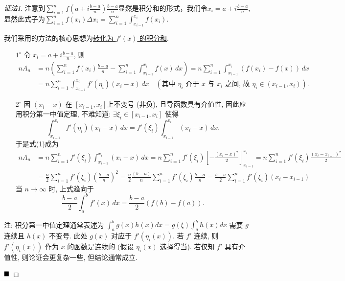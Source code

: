 \documentclass[lang=cn,newtx,10pt,scheme=chinese]{elegantbook}
\begin{document}
\begin{proof}[证法I]
    注意到$\sum_{i=1}^{n} f\left(a+i\frac{b-a}{n}\right)\frac{b-a}{n}$显然是积分和的形式，我们令$x_i=a+i\frac{b-a}{n}$,显然此式子为$\sum_{i=1}^{n} f\left(x_i\right)\Delta x_i = \sum_{i=1}^{n} \int_{x_{i-1}}^{x_i}f\left(x_i\right)$.

    我们采用的方法的核心思想为\underline{转化为 $f'(x)$ 的积分和}.
\begin{enumerate}
    \item[$1^\circ$] 令 $x_i = a + i \frac{b-a}{n}$, 则
    \begin{align*} nA_n &= n \left( \sum_{i=1}^n f(x_i) \frac{b-a}{n} - \sum_{i=1}^n \int_{x_{i-1}}^{x_i} f(x) \,dx \right) = n \sum_{i=1}^n \int_{x_{i-1}}^{x_i} (f(x_i) - f(x)) \,dx \quad  \\ &= n \sum_{i=1}^n \int_{x_{i-1}}^{x_i} f'(\eta_i)(x_i - x) \,dx \quad (\text{其中 } \eta_i \text{ 介于 } x \text{ 与 } x_i \text{ 之间, 故 } \eta_i \in (x_{i-1}, x_i)). \end{align*}
    \item[$2^\circ$] 因 $(x_i - x)$ 在 $[x_{i-1}, x_i]$上不变号 (非负), 且导函数具有介值性, 因此应用积分第一中值定理, 不难知道: $\exists \xi_i \in [x_{i-1}, x_i]$ 使得
    $$ \int_{x_{i-1}}^{x_i} f'(\eta_i)(x_i - x) \,dx = f'(\xi_i) \int_{x_{i-1}}^{x_i} (x_i - x) \,dx. $$
    于是式(1)成为
    \begin{align*} nA_n &= n \sum_{i=1}^n f'(\xi_i) \int_{x_{i-1}}^{x_i} (x_i - x) \,dx = n \sum_{i=1}^n f'(\xi_i) \left[ -\frac{(x_i-x)^2}{2} \right]_{x_{i-1}}^{x_i} = n \sum_{i=1}^n f'(\xi_i) \frac{(x_i-x_{i-1})^2}{2} \\ &= \frac{n}{2} \sum_{i=1}^n f'(\xi_i) \left(\frac{b-a}{n}\right)^2 = \frac{n}{2} \frac{(b-a)}{n} \sum_{i=1}^n f'(\xi_i) \frac{b-a}{n} = \frac{b-a}{2} \sum_{i=1}^n f'(\xi_i) (x_i-x_{i-1}) \end{align*}
    当 $n \to \infty$ 时, 上式趋向于
    $$ \frac{b-a}{2} \int_a^b f'(x) \,dx = \frac{b-a}{2} (f(b)-f(a)). $$
\end{enumerate}
\begin{remark}
    注: 积分第一中值定理通常表述为 $\int_a^b g(x)h(x)dx = g(\xi)\int_a^b h(x)dx$ 需要 $g$ 连续且 $h(x)$ 不变号. 此处 $g(x)$ 对应于 $f'(\eta_i(x))$. 若 $f'$ 连续, 则 $f'(\eta_i(x))$ 作为 $x$ 的函数是连续的 (假设 $\eta_i(x)$ 选择得当). 若仅知 $f'$ 具有介值性, 则论证会更复杂一些, 但结论通常成立.
\end{remark}
$\hfill \blacksquare$
\end{proof}
\end{document}
